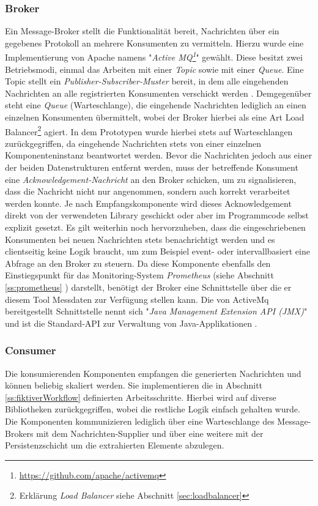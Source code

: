 \subsubsection{Broker}
\label{ss:broker}
Ein Message-Broker stellt die Funktionalität bereit, Nachrichten über ein gegebenes Protokoll an mehrere Konsumenten zu vermitteln. Hierzu wurde eine Implementierung von Apache namens "\emph{Active MQ\footnote{\url{https://github.com/apache/activemq}}}" gewählt. Diese besitzt zwei Betriebsmodi, einmal das Arbeiten mit einer \emph{Topic} sowie mit einer \emph{Queue}. Eine Topic stellt ein \emph{Publisher-Subscriber-Muster} bereit, in dem alle eingehenden Nachrichten an alle registrierten Konsumenten verschickt werden \cite[Seite~33 ff.]{activemq-snyder}. Demgegenüber steht eine \emph{Queue} (Warteschlange), die eingehende Nachrichten lediglich an einen einzelnen Konsumenten übermittelt, wobei der Broker hierbei als eine Art Load Balancer\footnote{Erklärung \emph{Load Balancer} siehe Abschnitt \ref{sec:loadbalancer} } agiert. In dem Prototypen wurde hierbei stets auf Warteschlangen zurückgegriffen, da eingehende Nachrichten stets von einer einzelnen Komponenteninstanz beantwortet werden. Bevor die Nachrichten jedoch aus einer der beiden Datenstrukturen entfernt werden, muss der betreffende Konsument eine \emph{Acknowledgement-Nachricht} an den Broker schicken, um zu signalisieren, dass die Nachricht nicht nur angenommen, sondern auch korrekt verarbeitet werden konnte. Je nach Empfangskomponente wird dieses Acknowledgement direkt von der verwendeten Library geschickt oder aber im Programmcode selbst explizit gesetzt. Es gilt weiterhin noch hervorzuheben, dass die eingeschriebenen Konsumenten bei neuen Nachrichten stets benachrichtigt werden und es clientseitig keine Logik braucht, um zum Beispiel event- oder intervallbasiert eine Abfrage an den Broker zu steuern. Da diese Komponente ebenfalls den Einstiegspunkt für das Monitoring-System \emph{Prometheus} (siehe Abschnitt \ref{ss:prometheus} ) darstellt, benötigt der Broker eine Schnittstelle über die er diesem Tool Messdaten zur Verfügung stellen kann. Die von ActiveMq bereitgestellt Schnittstelle nennt sich "\emph{Java Management Extension API (JMX)}" und ist die Standard-API zur Verwaltung von Java-Applikationen \cite[Seite~331 ff.]{activemq-snyder}.


\subsubsection{Consumer}
Die konsumierenden Komponenten empfangen die generierten Nachrichten und können beliebig skaliert werden. Sie implementieren die in Abschnitt \ref{ss:fiktiverWorkflow} definierten Arbeitsschritte. Hierbei wird auf diverse Bibliotheken zurückgegriffen, wobei die restliche Logik einfach gehalten wurde. Die Komponenten kommunizieren lediglich über eine Warteschlange des Message-Brokers mit dem Nachrichten-Supplier und über eine weitere mit der Persistenzschicht um die extrahierten Elemente abzulegen.


